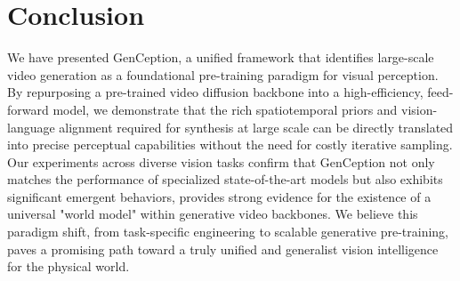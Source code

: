 \documentclass[11pt, a4paper, logo, onecolumn]{googledeepmind}
\newcommand{\ModelName}{GenCeption\xspace}
\begin{document}
\section{Conclusion}
We have presented \ModelName, a unified framework that identifies large-scale video generation as a foundational pre-training paradigm for visual perception. By repurposing a pre-trained video diffusion backbone into a high-efficiency, feed-forward model, we demonstrate that the rich spatiotemporal priors and vision-language alignment required for synthesis at large scale can be directly translated into precise perceptual capabilities without the need for costly iterative sampling.
Our experiments across diverse vision tasks confirm that \ModelName not only matches the performance of specialized state-of-the-art models but also exhibits significant emergent behaviors, 
provides strong evidence for the existence of a universal "world model" within generative video backbones. We believe this paradigm shift, from task-specific engineering to scalable generative pre-training, paves a promising path toward a truly unified and generalist vision intelligence for the physical world.





\clearpage
\end{document}
